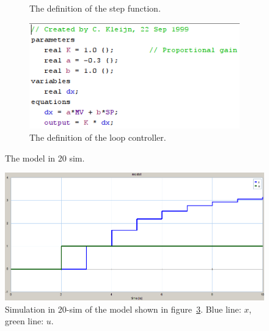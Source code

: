 \documentclass[a4paper,twoside,11pt]{article}
\begin{document}
\begin{figure}
\begin{subfigure}{0.5\textwidth}
	 \caption{The definition of the step function.}
	 \label{fig:3_1-20sim-model:step}
	\end{subfigure}%
	\begin{subfigure}{0.5\textwidth}
	 \centering
	 \includegraphics[width=\textwidth]{./images/3_1-20sim-model-controller.png}
	 \caption{The definition of the loop controller.}
	 \label{fig:3_1-20sim-model:cont}
	\end{subfigure}
	\caption{The model in 20 sim.}
	\label{fig:3_1-20sim-model}
\end{figure}

\begin{figure}
	\centering
	\includegraphics[width=\textwidth]{./images/3_1-simulation.png}
	\caption{Simulation in 20-sim of the model shown in figure~\ref{fig:3_1-20sim-model}. Blue line: $x$, green line: $u$.}
	\label{fig:3_1-simulation}
\end{figure}
\end{document}
